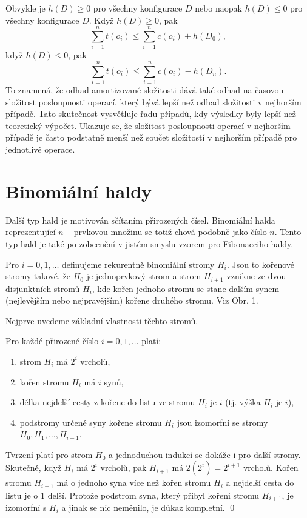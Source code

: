 \documentclass[a4paper,12pt]{article}
\begin{document}
Obvykle je $h(D)\ge 0$ pro všechny konfigurace $D$ 
nebo naopak $h(D)\le 0$ 
pro všechny konfigurace $D$. Když $h(D)\ge 0$, pak 
$$\sum_{i=1}^nt(o_i)\le\sum_{i=1}^nc(o_i)+h(D_0),$$
když $h(D)\le 0$, pak 
$$\sum_{i=1}^nt(o_i)\le\sum_{i=1}^nc(o_i)-h(D_n).$$
To znamená, že odhad amortizované složitosti dává také odhad 
na časovou složitost posloupnosti operací, který bývá lepší než odhad složitosti v 
nejhorším případě.  Tato skutečnost vysvětluje řadu 
případů, kdy 
výsledky byly lepší než teoretický výpočet.  Ukazuje se, že 
složitost posloupnosti operací v nejhorším případě je často podstatně 
menší než součet složitostí v nejhorším případě pro 
jednotlivé operace.  

\section{{Binomiální haldy}}

Další typ hald je motivován sčítaním přirozených čísel.  
Binomiální halda reprezentující $n-$prvkovou množinu se 
totiž chová 
podobně jako číslo $n$.  Tento typ hald je také po zobecnění v jistém 
smyslu vzorem pro Fibonacciho haldy.  

Pro $i=0,1,\dots$ definujeme rekurentně binomiální 
stromy $H_i$.  Jsou to kořenové stromy takové, že $H_0$ je 
jednoprvkový strom a  strom $H_{i+1}$ vznikne ze dvou 
disjunktních stromů $H_i$, kde kořen jednoho stromu  
se stane dalším synem (nejlevějším nebo nejpravějším) kořene druhého stromu.  Viz 
Obr.  1. 

\midinsert
\centerline{}
\endcaption
\endinsert

Nejprve uvedeme základní vlastnosti těchto 
stromů.

\begin{tvrzeni}Pro každé přirozené číslo $
i=0,1,\dots$ 
platí:
\begin{enumerate}
\item
strom $H_i$ má $2^i$ vrcholů,
\item
kořen stromu $H_i$ má $i$ synů,
\item
délka nejdelší cesty z kořene do listu ve stromu $H_i$ je 
$i$ (tj. výška $H_i$ je $i$),
\item
podstromy určené syny kořene stromu $H_i$ jsou izomorf\-ní 
se stromy $H_0,H_1,\dots,H_{i-1}$.
\end{enumerate}
\end{tvrzeni}

Tvrzení platí pro strom $H_0$ a 
jednoduchou indukcí se dokáže i pro další stromy. 
Skutečně, když $H_i$ má $2^i$ vrcholů, pak $H_{
i+1}$ má 
$2(2^i)=2^{i+1}$ vrcholů. Kořen stromu $H_{i+1}$ má o jednoho 
syna více než kořen stromu $H_i$ a nejdelší cesta do listu je o $
1$ 
delší. Protože podstrom syna, který přibyl kořeni stromu 
$H_{i+1}$, je izomorfní s $H_i$ a jinak se nic neměnilo, je 
důkaz kompletní. \qed
\enddemo
\end{document}
